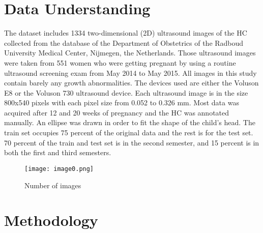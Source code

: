 \documentclass[twocolumn]{report}
\begin{document}
\chapter{Data Understanding}
The dataset includes 1334 two-dimensional (2D) ultrasound images of the HC collected from the database of the Department of Obstetrics of the Radboud University Medical Center, Nijmegen, the Netherlands. Those ultrasound images were taken from 551 women who were getting pregnant by using a routine ultrasound screening exam from May 2014 to May 2015. All images in this study contain barely any growth abnormalities. The devices used are either the Voluson E8 or the Voluson 730 ultrasound device. 
Each ultrasound image is in the size 800x540 pixels with each pixel size from 0.052 to 0.326 mm. Most data was acquired after 12 and 20 weeks of pregnancy and the HC was annotated manually. An ellipse was drawn in order to fit the shape of the child's head. 
The train set occupies 75 percent of the original data and the rest is for the test set. 70 percent of the train and test set is in the second semester, and 15 percent is in both the first and third semesters.
\begin{figure}[H]
    \centering
    \texttt{[image: image0.png]}
    \caption{Number of images}
    \label{fig:enter-label}
\end{figure}
\chapter{Methodology}
\end{document}
